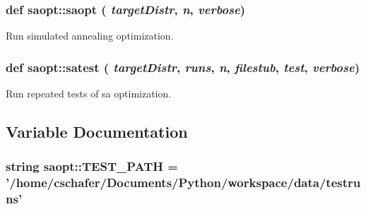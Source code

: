 \hypertarget{namespacesaopt_27363a0082deed7804d30ebdf145cd0a}{
\subsubsection[{saopt}]{\setlength{\rightskip}{0pt plus 5cm}def saopt::saopt ( {\em targetDistr}, \/   {\em n}, \/   {\em verbose})}}
\label{namespacesaopt_27363a0082deed7804d30ebdf145cd0a}


Run simulated annealing optimization. 

\hypertarget{namespacesaopt_515091c950b58a3cc0c8e785fc3f802a}{
\subsubsection[{satest}]{\setlength{\rightskip}{0pt plus 5cm}def saopt::satest ( {\em targetDistr}, \/   {\em runs}, \/   {\em n}, \/   {\em filestub}, \/   {\em test}, \/   {\em verbose})}}
\label{namespacesaopt_515091c950b58a3cc0c8e785fc3f802a}


Run repeated tests of sa optimization. 



\subsection{Variable Documentation}
\hypertarget{namespacesaopt_4077ce3616d15b802bafa0748162883e}{
\subsubsection[{TEST\_\-PATH}]{\setlength{\rightskip}{0pt plus 5cm}string {\bf saopt::TEST\_\-PATH} = '/home/cschafer/Documents/Python/workspace/{\bf data}/testruns'}}
\label{namespacesaopt_4077ce3616d15b802bafa0748162883e}


